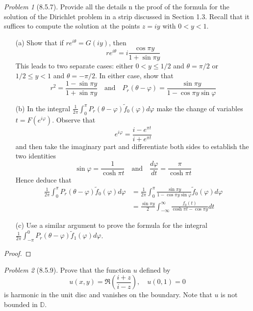 \documentclass[10pt]{article}
\newcommand{\sk}{\vskip 6mm}
\newcommand{\bb}[1]{\mathbb{#1}}
\newcommand{\wt}[1]{\widetilde{#1}}
\theoremstyle{remark}
\newtheorem{problem}{Problem}
\theoremstyle{remark}
\begin{document}
\begin{problem}[8.5.7]
  Provide all the details n the proof of the formula for the solution of
  the Dirichlet problem in a strip discussed in Section 1.3. Recall that
  it suffices to compute the solution at the points $z=iy$ with $0<y<1$.
  \begin{enumerate}
  \item[(a)] Show that if $re^{i\theta}=G(iy)$, then
    \[
      re^{i\theta}=i\frac{\cos\pi y}{1+\sin\pi y}
    \]
    This leads to two separate cases: either $0<y\leq 1/2$ and $\theta=\pi/2$
    or $1/2\leq y<1$ and $\theta=-\pi/2$. In either case, show that
    \[
      r^2=\frac{1-\sin\pi y}{1+\sin\pi y}\quad \text{and}\quad P_r(\theta-\varphi)=\frac{\sin\pi y}{1-\cos\pi y\sin\varphi}
    \]
  \item[(b)] In the integral
    $\frac{1}{2\pi}\int_0^\pi P_r(\theta-\varphi)\wt{f}_0(\varphi)d\varphi$
    make the change of variables $t=F(e^{i\varphi})$. Observe that
    \[
      e^{i\varphi}=\frac{i-e^{\pi t}}{i+e^{\pi t}}
    \]
    and then take the imaginary part and differentiate both sides to establish
    the two identities
    \[
      \sin\varphi = \frac{1}{\cosh \pi t}\quad \text{and}\quad \frac{d\varphi}{dt}=\frac{\pi}{\cosh\pi t}
    \]
    Hence deduce that
    \begin{align*}
      \frac{1}{2\pi}\int_0^\pi P_r(\theta-\varphi)\wt{f}_0(\varphi)d\varphi &=\frac{1}{2\pi}\int_0^\pi\frac{\sin\pi y}{1-\cos\pi y\sin\varphi}\wt{f}_0(\varphi)d\varphi\\
                                             &=\frac{\sin\pi y}{2}\int_{-\infty}^\infty\frac{f_0(t)}{\cosh\pi t-\cos\pi y}dt
    \end{align*}
  \item[(c)] Use a similar argument to prove the formula for the integral
    $\frac{1}{2\pi}\int_{-\pi}^0 P_r(\theta-\varphi)\wt{f}_1(\varphi)d\varphi$.
  \end{enumerate}
\end{problem}

\begin{proof}
  
\end{proof}

\sk

\begin{problem}[8.5.9]
  Prove that the function $u$ defined by
  \[
    u(x,y)=\Re(\frac{i+z}{i-z}),\quad u(0,1)=0
  \]
  is harmonic in the unit disc and vanishes on the boundary. Note that
  $u$ is not bounded in $\bb{D}$.
\end{problem}
\end{document}
